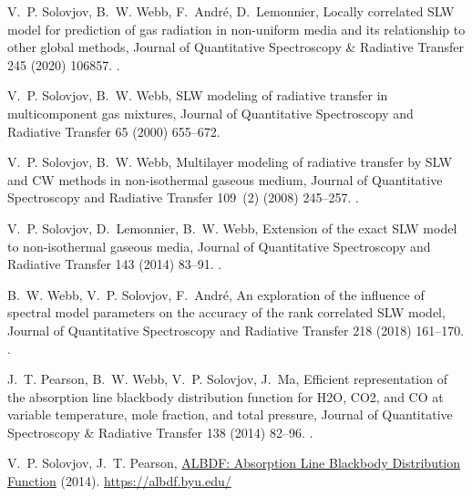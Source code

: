 \documentclass[preprint,12pt]{elsarticle}
\newcounter{bla}
\begin{document}
\begin{thebibliography}{10}
V.~P. Solovjov, B.~W. Webb, F.~Andr{\'e}, D.~Lemonnier, {Locally correlated
{SLW} model for prediction of gas radiation in non-uniform media and its
relationship to other global methods}, {Journal of Quantitative Spectroscopy
{\&} Radiative Transfer} 245 (2020) 106857.
\newblock \href {http://dx.doi.org/10.1016/j.jqsrt.2020.106857}
  {}.

V.~P. Solovjov, B.~W. Webb, {{SLW} modeling of radiative transfer in
multicomponent gas mixtures}, {Journal of Quantitative Spectroscopy and
Radiative Transfer} 65 (2000) 655--672.

V.~P. Solovjov, B.~W. Webb, {Multilayer modeling of radiative transfer by {SLW}
and {CW} methods in non-isothermal gaseous medium}, {Journal of Quantitative
Spectroscopy and Radiative Transfer} 109~(2) (2008) 245--257.
\newblock \href {http://dx.doi.org/10.1016/j.jqsrt.2007.08.015}
  {}.

V.~P. Solovjov, D.~Lemonnier, B.~W. Webb, {Extension of the exact {SLW} model
to non-isothermal gaseous media}, {Journal of Quantitative Spectroscopy and
Radiative Transfer} 143 (2014) 83--91.
\newblock \href {http://dx.doi.org/10.1016/j.jqsrt.2013.10.008}
  {}.

B.~W. Webb, V.~P. Solovjov, F.~Andr{\'e}, {An exploration of the influence of
spectral model parameters on the accuracy of the rank correlated SLW model},
{Journal of Quantitative Spectroscopy and Radiative Transfer} 218 (2018)
161--170.
\newblock \href {http://dx.doi.org/10.1016/j.jqsrt.2018.06.023}
  {}.

J.~T. Pearson, B.~W. Webb, V.~P. Solovjov, J.~Ma, {Efficient representation of
the absorption line blackbody distribution function for H2O, CO2, and CO at
variable temperature, mole fraction, and total pressure}, {Journal of
Quantitative Spectroscopy {\&} Radiative Transfer} 138 (2014) 82--96.
\newblock \href {http://dx.doi.org/10.1016/j.jqsrt.2014.01.019}
  {}.

V.~P. Solovjov, J.~T. Pearson, \href{https://albdf.byu.edu/}{{ALBDF: Absorption
Line Blackbody Distribution Function}} (2014).
\newline\urlprefix\url{https://albdf.byu.edu/}


\end{thebibliography}
\end{document}
